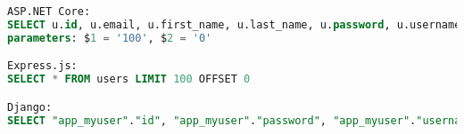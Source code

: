 \begin{lstlisting}[language=SQL,caption={\acrshort{sql} commands for retrieving multiple objects},breaklines=true,label={lst:sqlGetMany}]
ASP.NET Core:
SELECT u.id, u.email, u.first_name, u.last_name, u.password, u.username FROM users AS u ORDER BY u.id LIMIT $1 OFFSET $2
parameters: $1 = '100', $2 = '0'

Express.js:
SELECT * FROM users LIMIT 100 OFFSET 0

Django:
SELECT "app_myuser"."id", "app_myuser"."password", "app_myuser"."username", "app_myuser"."first_name", "app_myuser"."last_name", "app_myuser"."email" FROM "app_myuser" LIMIT 100
\end{lstlisting}
